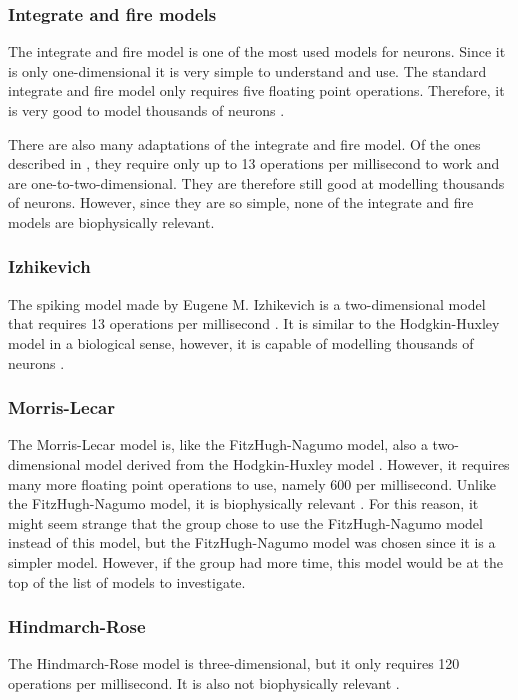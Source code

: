 \documentclass[class={myRUCProject}, crop=false]{standalone}
\begin{document}
\subsubsection*{Integrate and fire models}
The integrate and fire model is one of the most used models for neurons. Since it is only one-dimensional it is very simple to understand and use. The standard integrate and fire model only requires five floating point operations. Therefore, it is very good to model thousands of neurons \cite{izhikevich2004model}.

There are also many adaptations of the integrate and fire model. Of the ones described in \cite{izhikevich2004model}, they require only up to 13 operations per millisecond to work and are one-to-two-dimensional. They are therefore still good at modelling thousands of neurons. However, since they are so simple, none of the integrate and fire models are biophysically relevant.

\subsubsection*{Izhikevich}
The spiking model made by Eugene M. Izhikevich is a two-dimensional model that requires 13 operations per millisecond \cite{izhikevich2004model}. It is similar to the Hodgkin-Huxley model in a biological sense, however, it is capable of modelling thousands of neurons \cite{MUNI2022111759}. 

\subsubsection*{Morris-Lecar}
The Morris-Lecar model is, like the FitzHugh-Nagumo model, also a two-dimensional model derived from the Hodgkin-Huxley model \cite{baladron2012}. However, it requires many more floating point operations to use, namely 600 per millisecond. Unlike the FitzHugh-Nagumo model, it is biophysically relevant \cite{izhikevich2004model}. For this reason, it might seem strange that the group chose to use the FitzHugh-Nagumo model instead of this model, but the FitzHugh-Nagumo model was chosen since it is a simpler model. However, if the group had more time, this model would be at the top of the list of models to investigate. 


\subsubsection*{Hindmarch-Rose}
The Hindmarch-Rose model is three-dimensional, but it only requires 120 operations per millisecond. It is also not biophysically relevant \cite{izhikevich2004model}.
\end{document}
